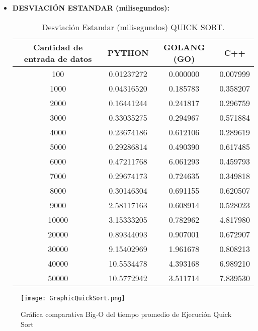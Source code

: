 \documentclass{article}
\begin{document}
\begin{itemize}
      \item \textbf{DESVIACIÓN ESTANDAR (milisegundos):}
        \begin{table}[H]
            \centering
            \begin{tabular}{||c c c c||} 
              \hline
              \textbf{Cantidad de entrada de datos} & \textbf{PYTHON} & \textbf{GOLANG (GO)} & \textbf{C++} \\ [0.5ex] 
              \hline\hline
              100    &  0.01237272  &  0.000000  &  0.007999  \\ [0.5ex]
              1000   &  0.04316520  &  0.185783  &  0.358207  \\ [0.5ex]
              2000   &  0.16441244  &  0.241817  &  0.296759  \\ [0.5ex]
              3000   &  0.33035275  &  0.294967  &  0.571884  \\ [0.5ex]
              4000   &  0.23674186  &  0.612106  &  0.289619  \\ [0.5ex]
              5000   &  0.29286814  &  0.490390  &  0.617485  \\ [0.5ex]
              6000   &  0.47211768  &  6.061293  &  0.459793  \\ [0.5ex]
              7000   &  0.29674173  &  0.724635  &  0.349818  \\ [0.5ex]
              8000   &  0.30146304  &  0.691155  &  0.620507  \\ [0.5ex]
              9000   &  2.58117163  &  0.608914  &  0.528023  \\ [0.5ex]
              10000  &  3.15333205  &  0.782962  &  4.817980  \\ [0.5ex]
              20000  &  0.89344093  &  0.907001  &  0.672907  \\ [0.5ex]
              30000  &  9.15402969  &  1.961678  &  0.808213  \\ [0.5ex]
              40000  &  10.5534478  &  4.393168  &  6.989210  \\ [0.5ex]
              50000  &  10.5772942  &  3.511714  &  7.839530  \\ [0.5ex]
              \hline
            \end{tabular}
            \caption{Desviación Estandar (milisegundos) QUICK SORT.}
            \label{table:desviacionEstandarQuickSort}
        \end{table}
    \end{itemize}

    \begin{figure}[H]
    \centering
    \texttt{[image: GraphicQuickSort.png]}
    \caption{\label{fig:bigOQuickSort}Gráfica comparativa Big-O del tiempo promedio de Ejecución Quick Sort}
    \end{figure}
\end{document}
